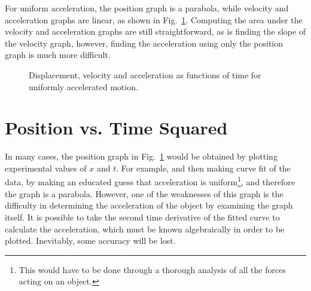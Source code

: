 \documentclass{../../../oss-handout}
\begin{document}
For uniform acceleration, the position graph is a parabola, while velocity and
acceleration graphs are linear, as shown in Fig.~\ref{uniform-acceleration}.
Computing the area under the velocity and acceleration graphs are still
straightforward, as is finding the slope of the velocity graph, however,
finding the acceleration using only the position graph is much more difficult.
\begin{figure}[!ht]
  \centering
  \hspace{.15in}
  \hspace{.15in}
  \caption{Displacement, velocity and acceleration as functions of time for
    uniformly accelerated motion.}
  \label{uniform-acceleration}
\end{figure}


\section{Position vs. Time Squared}
In many cases, the position graph in Fig.~\ref{uniform-acceleration} would be
obtained by plotting experimental values of $x$ and $t$. For example, and then making
curve fit of the data, by making an educated guess that acceleration is
uniform\footnote{This would have to be done through a thorough analysis of all
  the forces acting on an object.}, and therefore the graph is a parabola.
However, one of the weaknesses of this graph is the difficulty in determining
the acceleration of the object by examining the graph itself. It is possible to
take the second time derivative of the fitted curve to calculate the
acceleration, which must be known algebraically in order to be plotted.
Inevitably, some accuracy will be lost.
\end{document}
